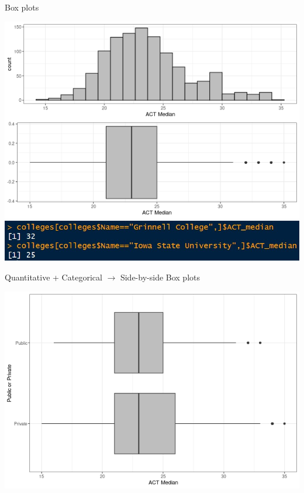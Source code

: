 \documentclass{beamer}
\begin{document}
\begin{frame}{Box plots}
\begin{center}
\includegraphics[scale=0.40]{hist_and_box.png}
\includegraphics[scale=.5]{img/college_act_example.jpg}
\end{center}
\end{frame}


\begin{frame}{Quantitative + Categorical $\rightarrow$ Side-by-side Box plots}
\begin{center}
\includegraphics[scale=0.5]{box_private.png}
\end{center}
\end{frame}
\end{document}
